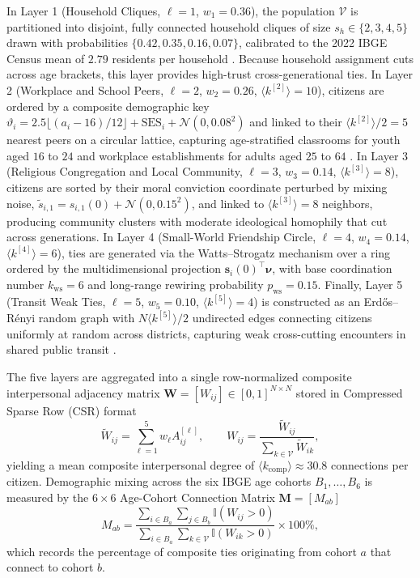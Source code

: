 \documentclass{article}
\begin{document}
In Layer 1 (Household Cliques, $\ell = 1$, $w_1 = 0.36$), the population $\mathcal{V}$ is partitioned into disjoint, fully connected household cliques of size $s_h \in \{2, 3, 4, 5\}$ drawn with probabilities $\{0.42, 0.35, 0.16, 0.07\}$, calibrated to the 2022 IBGE Census mean of $2.79$ residents per household \citep{ibge2022censo}. Because household assignment cuts across age brackets, this layer provides high-trust cross-generational ties. In Layer 2 (Workplace and School Peers, $\ell = 2$, $w_2 = 0.26$, $\langle k^{[2]} \rangle = 10$), citizens are ordered by a composite demographic key $\vartheta_i = 2.5 \lfloor(a_i - 16)/12\rfloor + \mathrm{SES}_i + \mathcal{N}(0, 0.08^2)$ and linked to their $\langle k^{[2]} \rangle / 2 = 5$ nearest peers on a circular lattice, capturing age-stratified classrooms for youth aged $16$ to $24$ \citep{inep2023censo} and workplace establishments for adults aged $25$ to $64$ \citep{mte2023rais}. In Layer 3 (Religious Congregation and Local Community, $\ell = 3$, $w_3 = 0.14$, $\langle k^{[3]} \rangle = 8$), citizens are sorted by their moral conviction coordinate perturbed by mixing noise, $\tilde{s}_{i,1} = s_{i,1}(0) + \mathcal{N}(0, 0.15^2)$, and linked to $\langle k^{[3]} \rangle = 8$ neighbors, producing community clusters with moderate ideological homophily \citep{mcpherson2001birds} that cut across generations. In Layer 4 (Small-World Friendship Circle, $\ell = 4$, $w_4 = 0.14$, $\langle k^{[4]} \rangle = 6$), ties are generated via the Watts--Strogatz mechanism \citep{watts1998collective} over a ring ordered by the multidimensional projection $\mathbf{s}_i(0)^\top \mathbf{\nu}$, with base coordination number $k_{\mathrm{ws}} = 6$ and long-range rewiring probability $p_{\mathrm{ws}} = 0.15$. Finally, Layer 5 (Transit Weak Ties, $\ell = 5$, $w_5 = 0.10$, $\langle k^{[5]} \rangle = 4$) is constructed as an Erd\H{o}s--R\'enyi random graph with $N \langle k^{[5]} \rangle / 2$ undirected edges connecting citizens uniformly at random across districts, capturing weak cross-cutting encounters in shared public transit \citep{granovetter1973strength, ibge2022censo}.

The five layers are aggregated into a single row-normalized composite interpersonal adjacency matrix $\mathbf{W} = [W_{ij}] \in [0, 1]^{N \times N}$ stored in Compressed Sparse Row (CSR) format
\begin{equation}
    \tilde{W}_{ij} = \sum_{\ell=1}^5 w_\ell A_{ij}^{[\ell]}, \qquad
    W_{ij} = \frac{\tilde{W}_{ij}}{\sum_{k \in \mathcal{V}} \tilde{W}_{ik}},
    \label{eq:composite_csr}
\end{equation}
yielding a mean composite interpersonal degree of $\langle k_{\mathrm{comp}} \rangle \approx 30.8$ connections per citizen. Demographic mixing across the six IBGE age cohorts $B_1, \dots, B_6$ is measured by the $6 \times 6$ Age-Cohort Connection Matrix $\mathbf{M} = [M_{ab}]$
\begin{equation}
    M_{ab} = \frac{\sum_{i \in B_a} \sum_{j \in B_b} \mathbb{I}(W_{ij} > 0)}{\sum_{i \in B_a} \sum_{k \in \mathcal{V}} \mathbb{I}(W_{ik} > 0)} \times 100\%,
    \label{eq:age_cohort_matrix}
\end{equation}
which records the percentage of composite ties originating from cohort $a$ that connect to cohort $b$.
\end{document}
